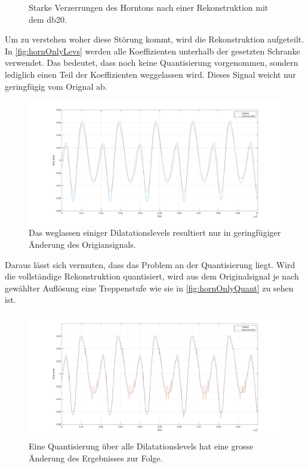 \begin{refsection}
\begin{figure}
	\caption{Starke Verzerrungen des Horntons nach einer Rekonstruktion mit dem db20.}
	\label{fig:hornBoth}
\end{figure}
Um zu verstehen woher diese Störung kommt, wird die Rekonstruktion aufgeteilt.
In  \autoref{fig:hornOnlyLevs} werden alle Koeffizienten unterhalb der gesetzten Schranke verwendet. 
Das bedeutet, dass noch keine Quantisierung vorgenommen, sondern lediglich einen Teil der Koeffizienten weggelassen wird.
Dieses Signal weicht nur geringfügig vom Orignal ab.
\begin{figure}
	\centering
	\includegraphics[width=\linewidth]{papers/compress/Bilder/hornOnlyLevs.pdf}
	\caption{Das weglassen einiger Dilatationslevels resultiert nur in geringfügiger Änderung des Origiansignals.}
	\label{fig:hornOnlyLevs}
\end{figure}
Daraus lässt sich vermuten, dass das Problem an der Quantisierung liegt.
Wird die vollständige Rekonstruktion quantisiert, wird aus dem Originalsignal je nach gewählter Auflösung eine Treppenstufe wie sie in \autoref{fig:hornOnlyQuant} zu sehen ist.
\begin{figure}
	\centering
	\includegraphics[width=\linewidth]{papers/compress/Bilder/hornOnlyQuant.pdf}
	\caption{Eine Quantisierung über alle Dilatationslevels hat eine grosse Änderung des Ergebnisses zur Folge.}

\end{figure}
\end{refsection}
